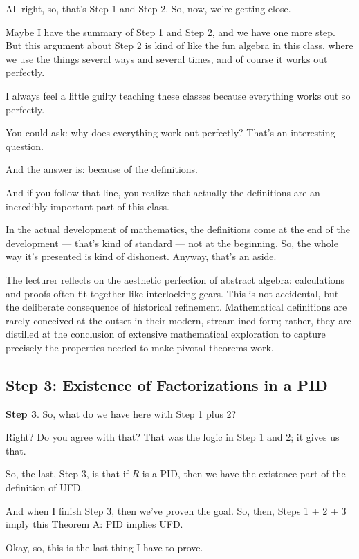 \begin{speech}[00:56:32 - 00:57:42]
All right, so, that's Step 1 and Step 2. So, now, we're getting close. 

Maybe I have the summary of Step 1 and Step 2, and we have one more step. But this argument about Step 2 is kind of like the fun algebra in this class, where we use the things several ways and several times, and of course it works out perfectly.

I always feel a little guilty teaching these classes because everything works out so perfectly.

You could ask: why does everything work out perfectly? That's an interesting question.

And the answer is: because of the definitions.

And if you follow that line, you realize that actually the definitions are an incredibly important part of this class.

In the actual development of mathematics, the definitions come at the end of the development --- that's kind of standard --- not at the beginning. So, the whole way it's presented is kind of dishonest. Anyway, that's an aside.
\end{speech}

\begin{insight}
The lecturer reflects on the aesthetic perfection of abstract algebra: calculations and proofs often fit together like interlocking gears. This is not accidental, but the deliberate consequence of historical refinement. Mathematical definitions are rarely conceived at the outset in their modern, streamlined form; rather, they are distilled at the conclusion of extensive mathematical exploration to capture precisely the properties needed to make pivotal theorems work.
\end{insight}

\subsection{Step 3: Existence of Factorizations in a PID}

\begin{speech}[00:57:42 - 00:59:02]
\textbf{Step 3}. So, what do we have here with Step 1 plus 2?


Right? Do you agree with that? That was the logic in Step 1 and 2; it gives us that.

So, the last, Step 3, is that if $R$ is a PID, then we have the existence part of the definition of UFD. 

And when I finish Step 3, then we've proven the goal. So, then, Steps 1 + 2 + 3 imply this Theorem A: PID implies UFD. 

Okay, so, this is the last thing I have to prove.
\end{speech}

